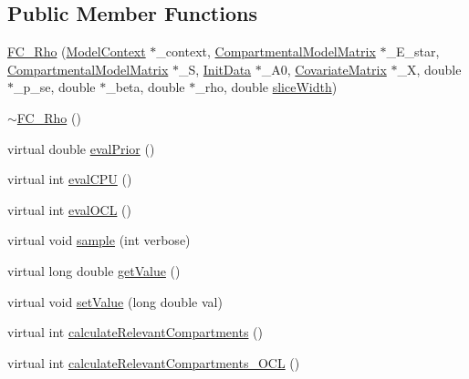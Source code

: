 \subsection*{Public Member Functions}
\begin{DoxyCompactItemize}
\item 
\hyperlink{classSpatialSEIR_1_1FC__Rho_abadb39705d3fc20b1a2df40b1cf247b5}{F\-C\-\_\-\-Rho} (\hyperlink{classSpatialSEIR_1_1ModelContext}{Model\-Context} $\ast$\-\_\-context, \hyperlink{classSpatialSEIR_1_1CompartmentalModelMatrix}{Compartmental\-Model\-Matrix} $\ast$\-\_\-\-E\-\_\-star, \hyperlink{classSpatialSEIR_1_1CompartmentalModelMatrix}{Compartmental\-Model\-Matrix} $\ast$\-\_\-\-S, \hyperlink{classSpatialSEIR_1_1InitData}{Init\-Data} $\ast$\-\_\-\-A0, \hyperlink{classSpatialSEIR_1_1CovariateMatrix}{Covariate\-Matrix} $\ast$\-\_\-\-X, double $\ast$\-\_\-p\-\_\-se, double $\ast$\-\_\-beta, double $\ast$\-\_\-rho, double \hyperlink{classSpatialSEIR_1_1FullConditional_a150ee031af8d086ad0a04b13630a110f}{slice\-Width})
\item 
\hyperlink{classSpatialSEIR_1_1FC__Rho_adc75eb5ad6bff0b1cadabb5c86c64a59}{$\sim$\-F\-C\-\_\-\-Rho} ()
\item 
virtual double \hyperlink{classSpatialSEIR_1_1FC__Rho_a8332bf928fd68a2dac08851089a4d527}{eval\-Prior} ()
\item 
virtual int \hyperlink{classSpatialSEIR_1_1FC__Rho_a65e892331f9a129fc5840e7e40af70d4}{eval\-C\-P\-U} ()
\item 
virtual int \hyperlink{classSpatialSEIR_1_1FC__Rho_a918b822d74871547519e5dc62c0bb25f}{eval\-O\-C\-L} ()
\item 
virtual void \hyperlink{classSpatialSEIR_1_1FC__Rho_a0d71fd3e8d9bd120991d60042c3e6a99}{sample} (int verbose)
\item 
virtual long double \hyperlink{classSpatialSEIR_1_1FC__Rho_a2f6ad33590328ce079e7bc9b4f078907}{get\-Value} ()
\item 
virtual void \hyperlink{classSpatialSEIR_1_1FC__Rho_a42dbc09ca0117f10ff27396cddb8dfa8}{set\-Value} (long double val)
\item 
virtual int \hyperlink{classSpatialSEIR_1_1FC__Rho_aaed549dd0c459e96c1697f0578830455}{calculate\-Relevant\-Compartments} ()
\item 
virtual int \hyperlink{classSpatialSEIR_1_1FC__Rho_a676f063fa861ac6297dc18c066bd7cf1}{calculate\-Relevant\-Compartments\-\_\-\-O\-C\-L} ()
\end{DoxyCompactItemize}
